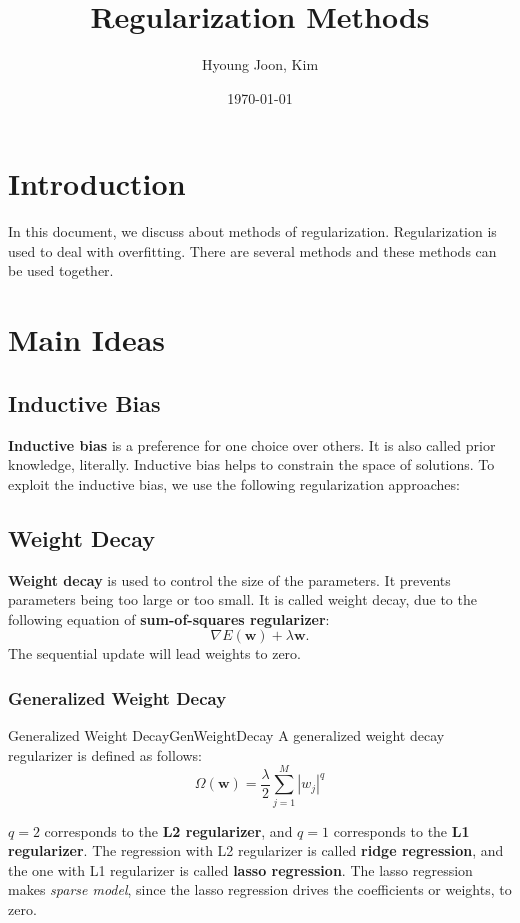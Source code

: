 \documentclass{article}
\title{Regularization Methods}
\author{Hyoung Joon, Kim}
\date{\today}
\begin{document}
\maketitle
\tableofcontents
\newpage

\section{Introduction}
    In this document, we discuss about methods of regularization.
    Regularization is used to deal with overfitting. There are several methods
    and these methods can be used together.

\section{Main Ideas}
    \subsection{Inductive Bias}
        \textbf{Inductive bias} is a preference for one choice over others. It is also called prior knowledge, literally.
        Inductive bias helps to constrain the space of solutions. To exploit the inductive bias, we use the following regularization approaches:

    \subsection{Weight Decay}
        \textbf{Weight decay} is used to control the size of the parameters.
        It prevents parameters being too large or too small.
        It is called weight decay, due to the following equation of \textbf{sum-of-squares regularizer}:
        \[
        \nabla E(\textbf{w}) + \lambda\textbf{w}.
        \]
        The sequential update will lead weights to zero.

        \subsubsection{Generalized Weight Decay}
        \begin{defn}{Generalized Weight Decay}{GenWeightDecay}
        A generalized weight decay regularizer is defined as follows:
        \[
        \Omega(\textbf{w}) = \frac{\lambda}{2}\sum_{j=1}^{M}\left|w_j\right|^q
        \]
        \end{defn}
        $q=2$ corresponds to the \textbf{L2 regularizer}, and $q=1$ corresponds to the \textbf{L1 regularizer}.
        The regression with L2 regularizer is called \textbf{ridge regression}, and the one with L1 regularizer is called \textbf{lasso regression}.
        The lasso regression makes \emph{sparse model}, since the lasso regression drives the coefficients or weights, to zero.
\end{document}
